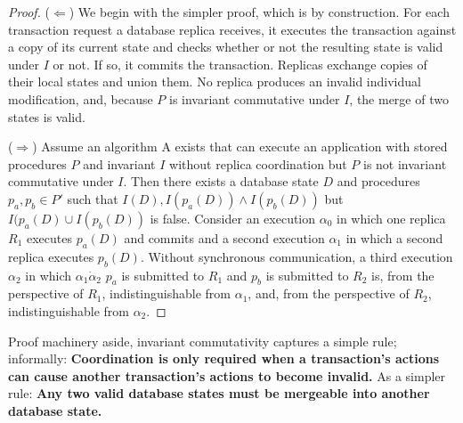 \begin{proof}
($\Leftarrow$) We begin with the simpler proof, which is by
  construction. For each transaction request a database replica
  receives, it executes the transaction against a copy of its current
  state and checks whether or not the resulting state is valid under
  $I$ or not. If so, it commits the transaction. Replicas exchange
  copies of their local states and union them. No replica produces an
  invalid individual modification, and, because $P$ is invariant
  commutative under $I$, the merge of two states is valid.

($\Rightarrow$) Assume an algorithm A exists that can execute an
  application with stored procedures $P$ and invariant $I$ without
  replica coordination but $P$ is not invariant commutative under
  $I$. Then there exists a database state $D$ and procedures $p_a,p_b
  \in P'$ such that $I(D), I(p_a(D)) \wedge I(p_b(D))$ but $I(p_a(D)
  \cup I(p_b(D))$ is false. Consider an execution $\alpha_0$ in which
  one replica $R_1$ executes $p_a(D)$ and commits and a second
  execution $\alpha_1$ in which a second replica executes
  $p_b(D)$. Without synchronous communication, a third execution
  $\alpha_2$ in which $\alpha_1 \dot \alpha_2$ $p_a$ is submitted to $R_1$ and $p_b$ is
  submitted to $R_2$ is, from the perspective of $R_1$,
  indistinguishable from $\alpha_1$, and, from the perspective of
  $R_2$, indistinguishable from $\alpha_2$.
\end{proof}

Proof machinery aside, invariant commutativity captures a simple rule;
informally: \textbf{Coordination is only required when a transaction's
  actions can cause another transaction's actions to become invalid.}
As a simpler rule: \textbf{Any two valid database states must be
  mergeable into another database state.}

